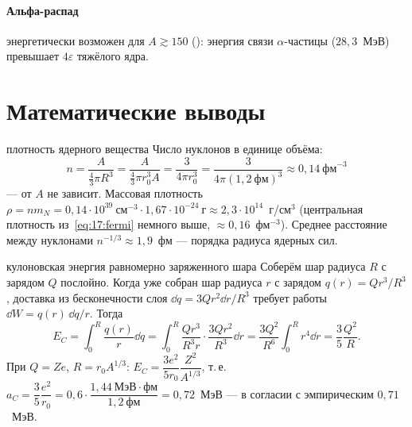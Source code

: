 \paragraph{Альфа-распад} энергетически возможен для $A\gtrsim150$ (): энергия связи $\alpha$-частицы ($28{,}3$~МэВ)
превышает $4\varepsilon$ тяжёлого ядра.

\section{Математические выводы}

\begin{derivation}[label=der:17:density]{плотность ядерного вещества}
Число нуклонов в единице объёма:
\[
  n=\frac{A}{\frac43\pi R^3}=\frac{A}{\frac43\pi r_0^3A}=\frac{3}{4\pi r_0^3}=\frac{3}{4\pi(1{,}2\ \text{фм})^3}\approx0{,}14\ \text{фм}^{-3}
\]
— от $A$ не зависит. Массовая плотность $\rho=nm_N=0{,}14\cdot10^{39}\ \text{см}^{-3}\cdot1{,}67\cdot10^{-24}\ \text{г}\approx2{,}3\cdot10^{14}$~г/см$^3$
(центральная плотность из~\eqref{eq:17:fermi} немного выше, $\approx0{,}16$~фм$^{-3}$). Среднее расстояние между нуклонами
$n^{-1/3}\approx1{,}9$~фм — порядка радиуса ядерных сил.
\end{derivation}

\begin{derivation}[label=der:17:coulomb]{кулоновская энергия равномерно заряженного шара}
Соберём шар радиуса $R$ с зарядом $Q$ послойно. Когда уже собран шар радиуса $r$ с зарядом $q(r)=Q r^3/R^3$, доставка из
бесконечности слоя $\dd q=3Qr^2\dd r/R^3$ требует работы $\dd W=q(r)\,\dd q/r$. Тогда
\[
  E_C=\int_0^R\frac{q(r)}{r}\dd q=\int_0^R\frac{Qr^3}{R^3r}\cdot\frac{3Qr^2}{R^3}\dd r=\frac{3Q^2}{R^6}\int_0^Rr^4\dd r=\frac35\frac{Q^2}{R}.
\]
При $Q=Ze$, $R=r_0A^{1/3}$: $E_C=\dfrac{3e^2}{5r_0}\dfrac{Z^2}{A^{1/3}}$, т.\,е. $a_C=\dfrac{3}{5}\dfrac{e^2}{r_0}=0{,}6\cdot\dfrac{1{,}44\ \text{МэВ}\cdot\text{фм}}{1{,}2\ \text{фм}}=0{,}72$~МэВ —
в согласии с эмпирическим $0{,}71$~МэВ.
\end{derivation}


